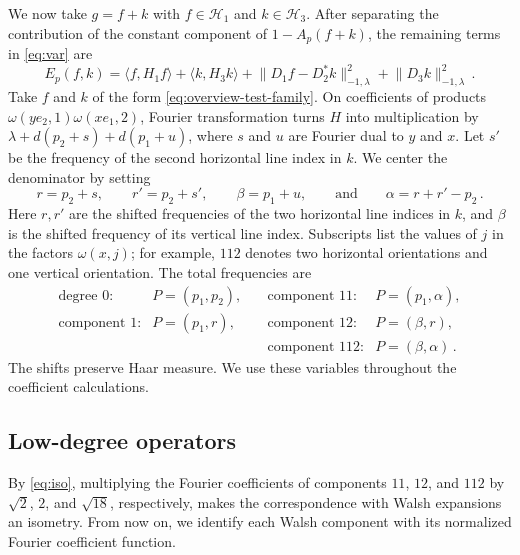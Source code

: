 \documentclass[11pt]{amsart}
\theoremstyle{plain}
\theoremstyle{definition}
\newcommand{\1}{\mathbf 1}
\newcommand{\ip}[2]{\langle #1,#2\rangle}
\newcommand{\norm}[1]{\lVert #1\rVert}
\newcommand{\Hs}{\mathcal H}
\newcommand{\Hminus}[1]{\norm{#1}_{-1,\lambda}}
\begin{document}
	We now take $g=f+k$ with $f\in\Hs_1$ and $k\in\Hs_3$.
	After separating the contribution of the constant component of
	$1-A_p(f+k)$, the remaining terms in \eqref{eq:var} are
	\begin{equation}\label{eq:E}
		E_p(f,k)=\ip f{H_1f}+\ip k{H_3k}
		+\Hminus{D_1f-D_2^*k}^2+\Hminus{D_3k}^2\, .
	\end{equation}
	Take $f$ and $k$ of the form \eqref{eq:overview-test-family}.
	On coefficients of products $\omega(ye_2,1)\omega(xe_1,2)$, Fourier
	transformation turns $H$ into multiplication by
	$\lambda+d(p_2+s)+d(p_1+u)$, where $s$ and $u$ are Fourier dual to $y$
	and $x$.  Let $s'$ be the frequency of the second horizontal line index
	in $k$.  We center the denominator by setting
	\begin{equation}\label{eq:shift}
		r=p_2+s,\qquad r'=p_2+s',\qquad \beta=p_1+u,
		\qquad\text{and}\qquad \alpha=r+r'-p_2\, .
	\end{equation}
	Here $r,r'$ are the shifted frequencies of the two horizontal line
	indices in $k$, and $\beta$ is the shifted frequency of its vertical
	line index.  Subscripts list the values of $j$ in the factors
	$\omega(x,j)$; for example, $112$ denotes two horizontal orientations
	and one vertical orientation.  The total frequencies are
	\[
	\renewcommand{\arraystretch}{1.15}
	\begin{array}{llll}
		\text{degree $0$:} & P=(p_1,p_2), &\quad
		\text{component $11$:} & P=(p_1,\alpha),\\
		\text{component $1$:} & P=(p_1,r), &\quad
		\text{component $12$:} & P=(\beta,r),\\
		& &\quad \text{component $112$:} & P=(\beta,\alpha)\, .
	\end{array}
	\]
	The shifts preserve Haar measure.  We use these variables throughout the
	coefficient calculations.
	
	
	\subsection{Low-degree operators}\label{ssec:low-operators}
	
	By \eqref{eq:iso}, multiplying the Fourier coefficients of components
	$11$, $12$, and $112$ by $\sqrt2$, $2$, and $\sqrt{18}$, respectively, makes
	the correspondence with Walsh expansions an isometry.  From now on,
	we identify each Walsh component with its normalized Fourier coefficient
	function.
	
\end{document}
